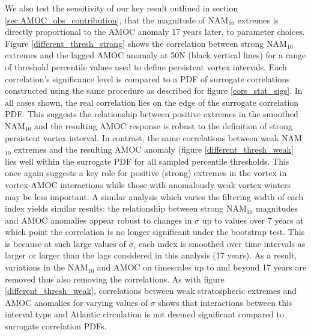We also test the sensitivity of our key result outlined in section \ref{sec:AMOC_obs_contribution}, that the magnitude of NAM$_{10}$ extremes is directly proportional to the AMOC anomaly 17 years later, to parameter choices. Figure \ref{different_thresh_strong} shows the correlation between strong NAM$_{10}$ extremes and the lagged AMOC anomaly at 50N (black vertical lines) for a range of threshold percentile values used to define persistent vortex intervals. Each correlation's significance level is compared to a PDF of surrogate correlations constructed using the same procedure as described for figure \ref{cors_stat_sigs}. In all cases shown, the real correlation lies on the edge of the surrogate correlation PDF. This suggests the relationship between positive extremes in the smoothed NAM$_{10}$ and the resulting AMOC response is robust to the definition of strong persistent vortex interval. In contrast, the same correlations between weak NAM$_{10}$ extremes and the resulting AMOC anomaly (figure \ref{different_thresh_weak} lies well within the surrogate PDF for all sampled percentile thresholds. This once again suggests a key role for positive (strong) extremes in the vortex in vortex-AMOC interactions while those with anomalously weak vortex winters may be less important. A similar analysis which varies the filtering width of each index yields similar results: the relationship between strong NAM$_{10}$ magnitudes and AMOC anomalies appear robust to changes in $\sigma$ up to values over 7 years at which point the correlation is no longer significant under the bootstrap test. This is because at such large values of $\sigma$, each index is smoothed over time intervals as larger or larger than the lags considered in this analysis (17 years). As a result, variations in the NAM$_{10}$ and AMOC on timescales up to and beyond 17 years are removed thus also removing the correlations. As with figure \ref{different_thresh_weak}, correlations between weak stratospheric extremes and AMOC anomalies for varying values of  $\sigma$ shows that interactions between this interval type and Atlantic circulation is not deemed significant compared to surrogate correlation PDFs.


